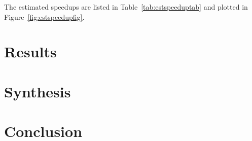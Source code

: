 \documentclass{article}
\begin{document}
  The estimated speedups are listed in Table~\ref{tab:estspeeduptab} and plotted
  in Figure~\ref{fig:estspeedupfig}.

  \section{Results}

 

  \section{Synthesis}

 

  \section{Conclusion}
\end{document}
